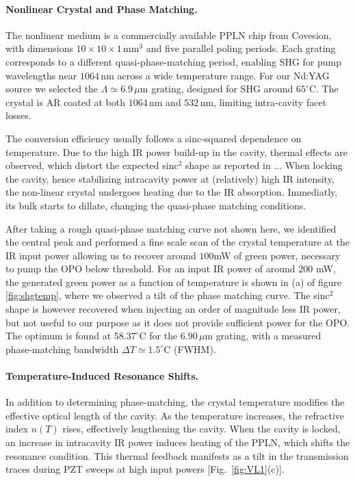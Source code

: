 \paragraph{Nonlinear Crystal and Phase Matching.}
The nonlinear medium is a commercially available PPLN chip from Covesion, with dimensions $10\times10\times1\,\mathrm{mm}^3$ and five parallel poling periods. Each grating corresponds to a different quasi-phase-matching period, enabling SHG for pump wavelengths near $1064\,\mathrm{nm}$ across a wide temperature range. For our Nd:YAG source we selected the $\Lambda \simeq 6.9\,\mu\mathrm{m}$ grating, designed for SHG around $65^{\circ}\mathrm{C}$. The crystal is AR coated at both $1064\,\mathrm{nm}$ and $532\,\mathrm{nm}$, limiting intra-cavity facet losses.

The conversion efficiency usually follows a sinc-squared dependence on temperature. Due to the high IR power build-up in the cavity, thermal effects are observed, which distort the expected sinc$^2$ shape as reported in ... When locking the cavity, hence stabilizing intracavity power at (relatively) high IR intensity, the non-linear crystal undergoes heating due to the IR absorption. Immediatly, its bulk starts to dillate, changing the quasi-phase matching conditions.  

After taking a rough quasi-phase matching curve not shown here, we identified the central peak and performed a fine scale scan of the crystal temperature at the IR input power allowing us to recover around $100$mW of green power, necessary to pump the OPO below threshold. For an input IR power of around $200$ mW, the generated green power as a function of temperature is shown in (a) of figure \ref{fig:shgtemp}, where we observed a tilt of the phase matching curve. The sinc$^2$ shape is however recovered when injecting an order of magnitude less IR power, but not useful to our purpose as it does not provide sufficient power for the OPO. The optimum is found at $58.37^{\circ}\mathrm{C}$ for the $6.90\,\mu\mathrm{m}$ grating, with a measured phase-matching bandwidth $\Delta T \simeq 1.5^{\circ}\mathrm{C}$ (FWHM). 

\paragraph{Temperature-Induced Resonance Shifts.}
In addition to determining phase-matching, the crystal temperature modifies the effective optical length of the cavity. As the temperature increases, the refractive index $n(T)$ rises, effectively lengthening the cavity. When the cavity is locked, an increase in intracavity IR power induces heating of the PPLN, which shifts the resonance condition. This thermal feedback manifests as a tilt in the transmission traces during PZT sweeps at high input powers [Fig.~\ref{fig:VL1}(c)]. 

